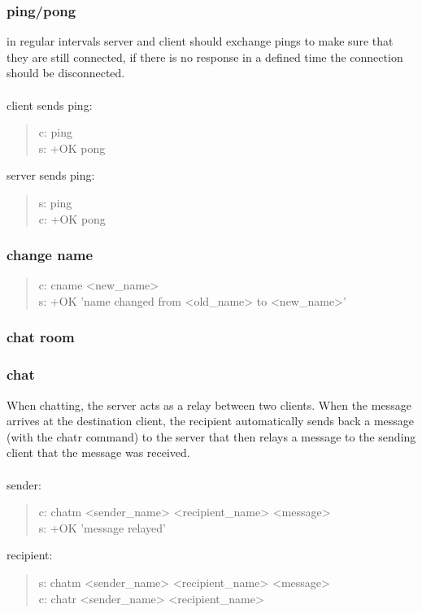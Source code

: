 \documentclass[a4paper,11pt]{article}
\begin{document}
\subsubsection{ping/pong}
in regular intervals server and client should exchange pings to make sure that they are still connected, if there is no response in a defined time the connection should be disconnected.\\\\
client sends ping:
\begin{quote}
  c: ping\\
  s: +OK pong
\end{quote}
\noindent
server sends ping:
\begin{quote}
  s: ping\\
  c: +OK pong
\end{quote}


\subsubsection{change name}

\begin{quote}
  c: cname <new\_name>\\
  s: +OK 'name changed from <old\_name> to <new\_name>'
\end{quote}

\subsubsection{chat room}

\subsubsection{chat}
When chatting, the server acts as a relay between two clients. When the message arrives at the destination client, the recipient automatically sends back a message (with the chatr command) to the server that then relays a message to the sending client that the message was received.\\\\
sender:
\begin{quote}
  c: chatm <sender\_name> <recipient\_name> <message>\\ %
  s: +OK 'message relayed'
\end{quote}
\noindent
recipient:
\begin{quote}
    s: chatm <sender\_name> <recipient\_name> <message>\\
  c: chatr <sender\_name> <recipient\_name>%
\end{quote}
\clearpage
\end{document}

